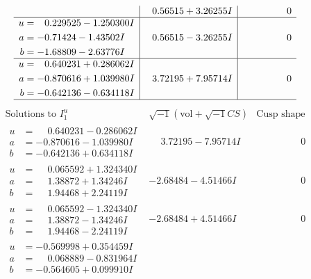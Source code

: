 \documentclass[1p]{elsarticle_modified}
\theoremstyle{definition}
\newcommand{\I}{\sqrt{-1}}
\begin{document}
$$\begin{array}{c|c|c}
 & \phantom{-}0.56515 + 3.26255 I & \phantom{-0.000000 } 0 \\ \hline\begin{aligned}
u &= \phantom{-}0.229525 - 1.250300 I \\
a &= -0.71424 - 1.43502 I \\
b &= -1.68809 - 2.63776 I\end{aligned}
 & \phantom{-}0.56515 - 3.26255 I & \phantom{-0.000000 } 0 \\ \hline\begin{aligned}
u &= \phantom{-}0.640231 + 0.286062 I \\
a &= -0.870616 + 1.039980 I \\
b &= -0.642136 - 0.634118 I\end{aligned}
 & \phantom{-}3.72195 + 7.95714 I & \phantom{-0.000000 } 0\\
 \hline 
 \end{array}$$\newpage$$\begin{array}{c|c|c}  
\text{Solutions to }I^u_{1}& \I (\text{vol} + \sqrt{-1}CS) & \text{Cusp shape}\\
 \hline 
\begin{aligned}
u &= \phantom{-}0.640231 - 0.286062 I \\
a &= -0.870616 - 1.039980 I \\
b &= -0.642136 + 0.634118 I\end{aligned}
 & \phantom{-}3.72195 - 7.95714 I & \phantom{-0.000000 } 0 \\ \hline\begin{aligned}
u &= \phantom{-}0.065592 + 1.324340 I \\
a &= \phantom{-}1.38872 + 1.34246 I \\
b &= \phantom{-}1.94468 + 2.24119 I\end{aligned}
 & -2.68484 - 4.51466 I & \phantom{-0.000000 } 0 \\ \hline\begin{aligned}
u &= \phantom{-}0.065592 - 1.324340 I \\
a &= \phantom{-}1.38872 - 1.34246 I \\
b &= \phantom{-}1.94468 - 2.24119 I\end{aligned}
 & -2.68484 + 4.51466 I & \phantom{-0.000000 } 0 \\ \hline\begin{aligned}
u &= -0.569998 + 0.354459 I \\
a &= \phantom{-}0.068889 - 0.831964 I \\
b &= -0.564605 + 0.099910 I\end{aligned}

\end{array}$$
\end{document}
